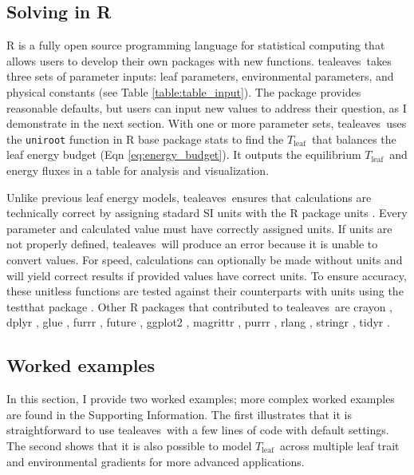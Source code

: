 \documentclass[11pt, oneside]{article}
\newcommand{\pkg}[1]{{\fontseries{b}\selectfont #1}}
\newcommand{\code}[1]{{\texttt{#1}}}
\newcommand{\tealeaves}{\pkg{tealeaves}}
\newcommand{\tleaf}{$T_\mathrm{leaf}$}
\begin{document}
\subsection*{Solving in R}

R is a fully open source programming language for statistical computing that allows users to develop their own packages with new functions. \tealeaves~takes three sets of parameter inputs: leaf parameters, environmental parameters, and physical constants (see Table \ref{table:table_input}). The package provides reasonable defaults, but users can input new values to address their question, as I demonstrate in the next section. With one or more parameter sets, \tealeaves~uses the \code{uniroot} function in R base package \pkg{stats} to find the \tleaf~that balances the leaf energy budget (Eqn \ref{eq:energy_budget}). It outputs the equilibrium \tleaf~and energy fluxes in a table for analysis and visualization.

Unlike previous leaf energy models, \tealeaves~ensures that calculations are technically correct by assigning stadard SI units with the R package \pkg{units} \cite{Pebesma_etal_2016}. Every parameter and calculated value must have correctly assigned units. If units are not properly defined, \tealeaves~will produce an error because it is unable to convert values. For speed, calculations can optionally be made without units and will yield correct results if provided values have correct units. To ensure accuracy, these unitless functions are tested against their counterparts with units using the \pkg{testthat} package \citep{Wickham_2011b}. Other R packages that contributed to \tealeaves~are \pkg{crayon} \citep{Csardi_2017}, \pkg{dplyr} \citep{Wickham_etal_2019}, \pkg{glue} \citep{Hester_2019}, \pkg{furrr} \citep{Vaughan_Dancho_2018}, \pkg{future} \citep{Bengtsson_2019}, \pkg{ggplot2} \citep{Wickham_2016}, \pkg{magrittr} \citep{Bache_Wickham_2014}, \pkg{purrr} \citep{Henry_Wickham_2019b}, \pkg{rlang} \citep{Henry_Wickham_2019a}, \pkg{stringr} \citep{Wickham_2019}, \pkg{tidyr} \citep{Wickham_Henry_2019}.

\subsection*{Worked examples}

In this section, I provide two worked examples; more complex worked examples are found in the Supporting Information. The first illustrates that it is straightforward to use \tealeaves~with a few lines of code with default settings. The second shows that it is also possible to model \tleaf~across multiple leaf trait and environmental gradients for more advanced applications.
\end{document}
